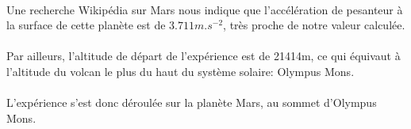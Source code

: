 \documentclass[12pt,a4paper]{extreport}
\begin{document}
\paragraph*{}
Une recherche Wikipédia sur Mars nous indique que l'accélération de pesanteur à la surface de cette planète est de $3.711 m.s^{-2}$, très proche de notre valeur calculée.

\paragraph*{}
Par ailleurs, l'altitude de départ de l'expérience est de 21414m, ce qui équivaut à l'altitude du volcan le plus du haut du système solaire: Olympus Mons.

\paragraph*{}
L'expérience s'est donc déroulée sur la planète Mars, au sommet d'Olympus Mons.
\end{document}
